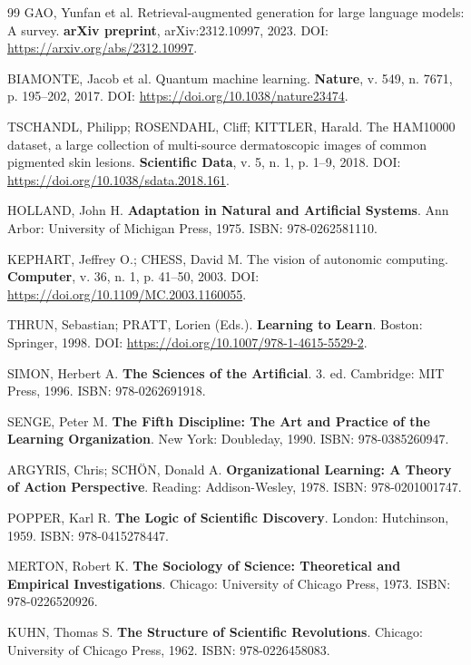 \begin{thebibliography}{99}
GAO, Yunfan et al. Retrieval-augmented generation for large language models: A survey. \textbf{arXiv preprint}, arXiv:2312.10997, 2023. DOI: \url{https://arxiv.org/abs/2312.10997}.

BIAMONTE, Jacob et al. Quantum machine learning. \textbf{Nature}, v. 549, n. 7671, p. 195--202, 2017. DOI: \url{https://doi.org/10.1038/nature23474}.

TSCHANDL, Philipp; ROSENDAHL, Cliff; KITTLER, Harald. The HAM10000 dataset, a large collection of multi-source dermatoscopic images of common pigmented skin lesions. \textbf{Scientific Data}, v. 5, n. 1, p. 1--9, 2018. DOI: \url{https://doi.org/10.1038/sdata.2018.161}.

HOLLAND, John H. \textbf{Adaptation in Natural and Artificial Systems}. Ann Arbor: University of Michigan Press, 1975. ISBN: 978-0262581110.

KEPHART, Jeffrey O.; CHESS, David M. The vision of autonomic computing. \textbf{Computer}, v. 36, n. 1, p. 41--50, 2003. DOI: \url{https://doi.org/10.1109/MC.2003.1160055}.

THRUN, Sebastian; PRATT, Lorien (Eds.). \textbf{Learning to Learn}. Boston: Springer, 1998. DOI: \url{https://doi.org/10.1007/978-1-4615-5529-2}.

SIMON, Herbert A. \textbf{The Sciences of the Artificial}. 3. ed. Cambridge: MIT Press, 1996. ISBN: 978-0262691918.

SENGE, Peter M. \textbf{The Fifth Discipline: The Art and Practice of the Learning Organization}. New York: Doubleday, 1990. ISBN: 978-0385260947.

ARGYRIS, Chris; SCHÖN, Donald A. \textbf{Organizational Learning: A Theory of Action Perspective}. Reading: Addison-Wesley, 1978. ISBN: 978-0201001747.

POPPER, Karl R. \textbf{The Logic of Scientific Discovery}. London: Hutchinson, 1959. ISBN: 978-0415278447.

MERTON, Robert K. \textbf{The Sociology of Science: Theoretical and Empirical Investigations}. Chicago: University of Chicago Press, 1973. ISBN: 978-0226520926.

KUHN, Thomas S. \textbf{The Structure of Scientific Revolutions}. Chicago: University of Chicago Press, 1962. ISBN: 978-0226458083.


\end{thebibliography}
